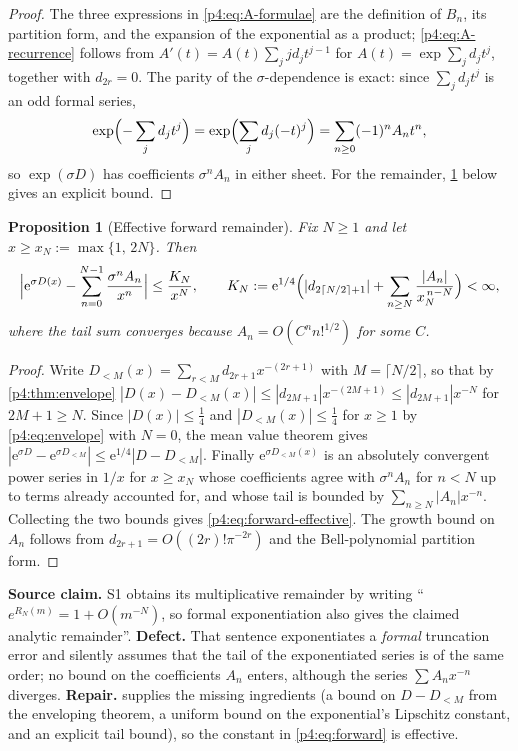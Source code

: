 \documentclass[11pt,a4paper,oneside]{book}
\theoremstyle{plain}
\newtheorem{proposition}[theorem]{Proposition}
\theoremstyle{definition}
\theoremstyle{remark}
\newcommand{\e}{\mathrm{e}}
\newcommand{\EB}{B}
\begin{document}
\begin{proof}
The three expressions in \cref{p4:eq:A-formulae} are the definition of
$\EB_n$, its partition form, and the expansion of the exponential as a
product; \cref{p4:eq:A-recurrence} follows from $A'(t)=A(t)\sum_jjd_jt^{j-1}$
for $A(t)=\exp\sum_jd_jt^j$, together with $d_{2r}=0$.  The parity of the
$\sigma$-dependence is exact: since $\sum_jd_jt^j$ is an odd formal series,
\[
  \exp\Bigl(-\sum_jd_jt^j\Bigr)=\exp\Bigl(\sum_jd_j(-t)^j\Bigr)
  =\sum_{n\ge0}(-1)^{n}A_nt^{n},
\]
so $\exp(\sigma D)$ has coefficients $\sigma^nA_n$ in either sheet.  For the
remainder, \cref{p4:prop:forward-effective} below gives an explicit bound.
\end{proof}

\begin{proposition}[Effective forward remainder]
\label{p4:prop:forward-effective}
Fix $N\ge1$ and let $x\ge x_N:=\max\{1,\,2N\}$.  Then
\begin{equation}
  \Bigl|\e^{\sigma D(x)}-\sum_{n=0}^{N-1}\frac{\sigma^nA_n}{x^{n}}\Bigr|
  \le \frac{K_N}{x^{N}},
  \qquad
  K_N:=\e^{1/4}\Bigl(|d_{2\lceil N/2\rceil+1}|
       +\sum_{n\ge N}\frac{|A_n|}{x_N^{\,n-N}}\Bigr)<\infty,
  \label{p4:eq:forward-effective}
\end{equation}
where the tail sum converges because $A_n=O(C^{n}n!^{1/2})$ for some $C$.
\end{proposition}

\begin{proof}
Write $D_{<M}(x)=\sum_{r<M}d_{2r+1}x^{-(2r+1)}$ with $M=\lceil N/2\rceil$, so
that by \cref{p4:thm:envelope} $|D(x)-D_{<M}(x)|\le|d_{2M+1}|x^{-(2M+1)}\le
|d_{2M+1}|x^{-N}$ for $2M+1\ge N$.  Since $|D(x)|\le\tfrac14$ and
$|D_{<M}(x)|\le\tfrac14$ for $x\ge1$ by \cref{p4:eq:envelope} with $N=0$,
the mean value theorem gives
$|\e^{\sigma D}-\e^{\sigma D_{<M}}|\le\e^{1/4}|D-D_{<M}|$.  Finally
$\e^{\sigma D_{<M}(x)}$ is an absolutely convergent power series in $1/x$ for
$x\ge x_N$ whose coefficients agree with $\sigma^nA_n$ for $n<N$ up to terms
already accounted for, and whose tail is bounded by
$\sum_{n\ge N}|A_n|x^{-n}$.  Collecting the two bounds gives
\cref{p4:eq:forward-effective}.  The growth bound on $A_n$ follows from
$d_{2r+1}=O((2r)!\pi^{-2r})$ and the Bell-polynomial partition form.
\end{proof}

\begin{repairbox}
\textbf{Source claim.}  \textsf{S1} obtains its multiplicative remainder by
writing ``$e^{R_N(m)}=1+O(m^{-N})$, so formal exponentiation also gives the
claimed analytic remainder''.  \textbf{Defect.}  That sentence exponentiates a
\emph{formal} truncation error and silently assumes that the tail of the
exponentiated series is of the same order; no bound on the coefficients $A_n$
enters, although the series $\sum A_nx^{-n}$ diverges.  \textbf{Repair.}
 supplies the missing ingredients (a bound on
$D-D_{<M}$ from the enveloping theorem, a uniform bound on the exponential's
Lipschitz constant, and an explicit tail bound), so the constant in
\cref{p4:eq:forward} is effective.
\end{repairbox}
\end{document}
